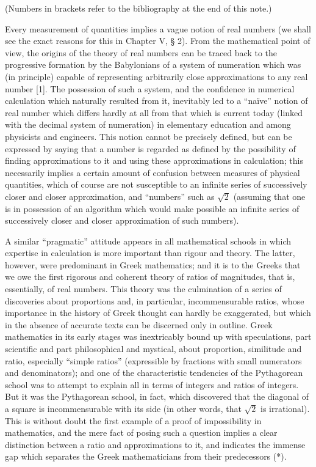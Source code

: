 
(Numbers in brackets refer to the bibliography at the end of this note.)

Every measurement of quantities implies a vague notion of real numbers (we shall see the exact reasons for this in Chapter V, § 2). From the mathematical point of view, the origins of the theory of real numbers can be traced back to the progressive formation by the Babylonians of a system of numeration which was (in principle) capable of representing arbitrarily close approximations to any real number {[}1{]}. The possession of such a system, and the confidence in numerical calculation which naturally resulted from it, inevitably led to a ``naïve'' notion of real number which differs hardly at all from that which is current today (linked with the decimal system of numeration) in elementary education and among physicists and engineers. This notion cannot be precisely defined, but can be expressed by saying that a number is regarded as defined by the possibility of finding approximations to it and using these approximations in calculation; this necessarily implies a certain amount of confusion between measures of physical quantities, which of course are not susceptible to an infinite series of successively closer and closer approximation, and ``numbers'' such as \(\sqrt{2}\) (assuming that one is in possession of an algorithm which would make possible an infinite series of successively closer and closer approximation of such numbers).

A similar ``pragmatic'' attitude appears in all mathematical schools in which expertise in calculation is more important than rigour and theory. The latter, however, were predominant in Greek mathematics; and it is to the Greeks that we owe the first rigorous and coherent theory of ratios of magnitudes, that is, essentially, of real numbers. This theory was the culmination of a series of discoveries about proportions and, in particular, incommensurable ratios, whose importance in the history of Greek thought can hardly be exaggerated, but which in the absence of accurate texts can be discerned only in outline. Greek mathematics in its early stages was inextricably bound up with speculations, part scientific and part philosophical and mystical, about proportion, similitude and ratio, especially ``simple ratios'' (expressible by fractions with small numerators and denominators); and one of the characteristic tendencies of the Pythagorean school was to attempt to explain all in terms of integers and ratios of integers. But it was the Pythagorean school, in fact, which discovered that the diagonal of a square is incommensurable with its side (in other words, that \(\sqrt{2}\) is irrational). This is without doubt the first example of a proof of impossibility in mathematics, and the mere fact of posing such a question implies a clear distinction between a ratio and approximations to it, and indicates the immense gap which separates the Greek mathematicians from their predecessors (*).

